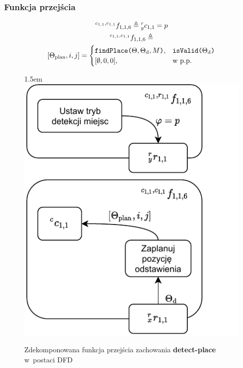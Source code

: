 \subsubsection{Funkcja przejścia}
\begin{equation}
    \begin{gathered}
        {}^{c_{1,1}, r_{1,1}}f_{1,1,6} \triangleq {}^{r}_{y}c_{1,1} = p\\
        {}^{c_{1,1}, c_{1,1}}f_{1,1,6} \triangleq \\ [\Theta_{\mathrm{plan}}, i, j] =
            \begin{cases}
			    \text{\texttt{findPlace($\Theta, \Theta_{\mathrm{d}}, M$)}}, & \text{\texttt{isValid($\Theta_{\mathrm{d}}$)}}\\
                [\emptyset, 0, 0], & \text{w p.p.}
		    \end{cases}
    \end{gathered}
\end{equation}

\begin{figure}[ht]
    \leftskip1.5em
    \includegraphics[width=\columnwidth]{figures/ISR-cs-fp-detect-place.pdf}
    \caption{Zdekomponowana funkcja przejścia zachowania \textbf{detect-place} w~postaci DFD}
    \label{fig:cs-fp-detect-place}
\end{figure}


